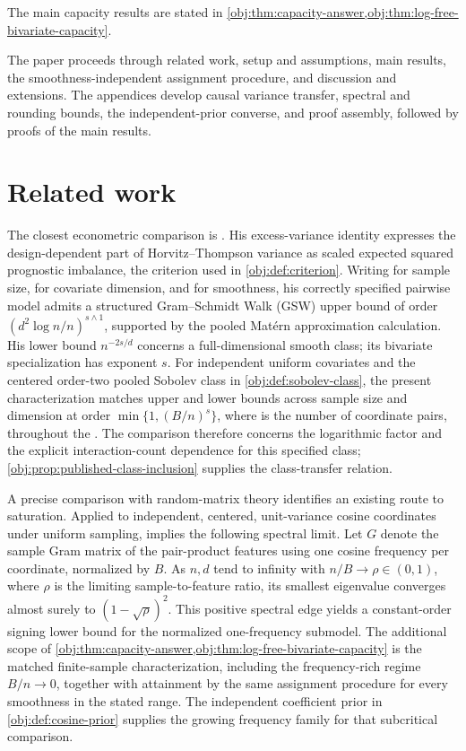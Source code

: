 \documentclass[11pt]{article}
\begin{document}
The main capacity results are stated in \cref{obj:thm:capacity-answer,obj:thm:log-free-bivariate-capacity}.

The paper proceeds through related work, setup and assumptions, main results, the smoothness-independent assignment procedure, and discussion and extensions. The appendices develop causal variance transfer, spectral and rounding bounds, the independent-prior converse, and proof assembly, followed by proofs of the main results.


\section{Related work}

The closest econometric comparison is \citet[Proposition 2.3, equation (2.4), Theorem B.8(ii), Lemma B.9, and Theorem 4.9]{Cytrynbaum2026Limits}. His excess-variance identity expresses the design-dependent part of Horvitz--Thompson variance as scaled expected squared prognostic imbalance, the criterion used in \cref{obj:def:criterion}. Writing  for sample size,  for covariate dimension, and  for smoothness, his correctly specified pairwise model admits a structured Gram--Schmidt Walk (GSW) upper bound of order \((d^2\log n/n)^{s\wedge1}\), supported by the pooled Mat\'ern approximation calculation. His lower bound \(n^{-2s/d}\) concerns a full-dimensional smooth class; its bivariate specialization has exponent \(s\). For independent uniform covariates and the centered order-two pooled Sobolev class in \cref{obj:def:sobolev-class}, the present characterization matches upper and lower bounds across sample size and dimension at order \(\min\{1,(B/n)^s\}\), where  is the number of coordinate pairs, throughout the . The comparison therefore concerns the logarithmic factor and the explicit interaction-count dependence for this specified class; \cref{obj:prop:published-class-inclusion} supplies the class-transfer relation.

A precise comparison with random-matrix theory identifies an existing route to saturation. Applied to independent, centered, unit-variance cosine coordinates under uniform sampling, \citet[Theorem 1.2(2a)]{KoganNandyHuang2024Extremal} implies the following spectral limit. Let \(G\) denote the sample Gram matrix of the pair-product features using one cosine frequency per coordinate, normalized by \(B\). As \(n,d\) tend to infinity with \(n/B\to\rho\in(0,1)\), where \(\rho\) is the limiting sample-to-feature ratio, its smallest eigenvalue converges almost surely to \((1-\sqrt{\rho})^2\). This positive spectral edge yields a constant-order signing lower bound for the normalized one-frequency submodel. The additional scope of \cref{obj:thm:capacity-answer,obj:thm:log-free-bivariate-capacity} is the matched finite-sample characterization, including the frequency-rich regime \(B/n\to0\), together with attainment by the same assignment procedure for every smoothness in the stated range. The independent coefficient prior in \cref{obj:def:cosine-prior} supplies the growing frequency family for that subcritical comparison.
\end{document}
